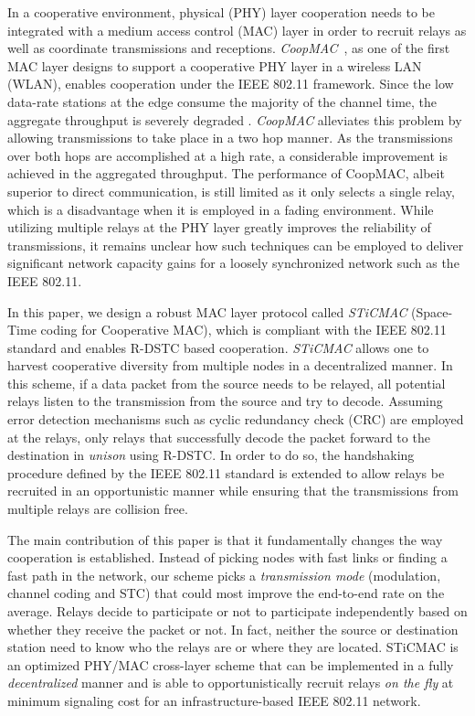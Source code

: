 \documentclass[peerreview,draftcls,onecolumn,12pt,a4paper]{IEEEtran}
\begin{document}
In a cooperative environment, physical (PHY) layer cooperation needs to be integrated with a medium access control (MAC) layer in order to recruit relays as well as coordinate transmissions and receptions. \emph{CoopMAC}~\cite{coopmacliu}, as one of the first MAC layer designs to support a cooperative PHY layer in a wireless LAN (WLAN),  enables cooperation under the IEEE 802.11 framework. Since the low data-rate stations at the edge consume the majority of the channel time, the aggregate throughput is severely degraded \cite{Heusse03}. \emph{CoopMAC} alleviates this problem by allowing transmissions to take place in a two hop manner. As the transmissions over both hops are accomplished at a high rate, a considerable improvement is achieved in the aggregated throughput. The performance of CoopMAC, albeit superior to direct communication, is still limited as it only selects a single relay, which is a disadvantage when it is employed in a fading environment.  While utilizing multiple relays at the PHY layer greatly improves the reliability of transmissions, it remains unclear how such techniques can be employed to deliver significant network capacity gains for a loosely synchronized network such as the IEEE 802.11.


In this paper, we design a robust MAC layer protocol called \emph{STiCMAC} (Space-Time coding for Cooperative MAC), which is compliant with the IEEE 802.11 standard and enables R-DSTC based cooperation. \emph{STiCMAC} allows one to harvest cooperative diversity from multiple nodes in a decentralized manner. In this scheme, if a data packet from the source needs to be relayed, all potential relays listen to the transmission from the source and try to decode. Assuming error detection mechanisms  such as  cyclic redundancy check (CRC) are employed at the relays, only relays that successfully decode the packet forward to the destination in \emph{unison} using R-DSTC. In order to do so, the handshaking procedure defined by the IEEE 802.11 standard is extended to allow relays be recruited in an opportunistic manner while ensuring that the transmissions from multiple relays are collision free.


The main contribution of this paper is that it fundamentally changes the way cooperation is established. Instead of picking nodes with fast links or finding a fast path in the network, our scheme picks a \emph{ transmission mode} (modulation, channel coding and STC) that could most improve the end-to-end rate on the average. Relays decide to participate or not to participate independently based on whether they receive the packet or not. In fact, neither the source or destination station need to know who the relays are or where they are located. STiCMAC is an optimized PHY/MAC cross-layer scheme that can be implemented in a fully \emph{decentralized} manner and is able to opportunistically recruit relays \emph{on the fly} at minimum signaling cost for an infrastructure-based IEEE 802.11 network.
\end{document}
